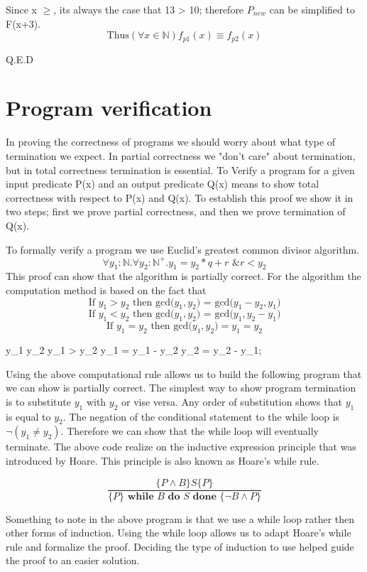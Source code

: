 \documentclass{article}
\begin{document}
Since x $\geq$, its always the case that 13 > 10; therefore $P_{new}$ can be simplified to F(x+3). 
\[\text{Thus} (\forall x \in \mathbb{N}) f_{p1} (x) \equiv f_{p2} (x)\]

Q.E.D

\section{Program verification }

In proving the correctness of programs we should worry about what type of termination we expect. In partial correctness we "don't care" about termination, but in total correctness termination is essential. To Verify a program for a given input predicate P(x) and an output predicate Q(x) means to show total correctness with respect to P(x) and Q(x). To establish this proof we show it in two steps; first we prove partial correctness, and then we prove termination of Q(x). 

To formally verify a program we use Euclid's greatest common divisor algorithm. 
\[\forall y_1 :\mathbb{N}. \forall y_2:\mathbb{N}^+ . y_1 = y_2 * q + r \text{ \& } r < y_2\]
This proof can show that the algorithm is partially correct. For the algorithm the computation method is based on the fact that 
\[\text{If  }y_1 >  y_2\text{ then  gcd(}y_1,y_2\text{) =  gcd(}y_1-y_2, y_1)\]
\[\text{If  }y_1 < y_2\text{ then  gcd(}y_1,y_2\text{) =  gcd(}y_1,y_2 - y_1)\]
\[\text{If  }y_1 =  y_2\text{ then  gcd(}y_1,y_2) = y_1 = y_2\]

\begin{program} 
\WHILE y_1 \neq y_2 \DO 
	\IF y_1 > y_2 \THEN y_1 = y_1 - y_2 \ELSE y_2 = y_2 - y_1; 
\end{program}

Using the above computational rule allows us to build the following program that we can show is partially correct. The simplest way to show program termination is to substitute $y_1$ with $y_2$ or vise versa. Any order of substitution shows that $y_1$ is equal to  $y_2$. The negation of the conditional statement to the while loop is $\neg(y_1 \neq y_2)$. Therefore we can show that the while loop will eventually terminate. The above code realize on the inductive expression principle that was introduced by Hoare. This principle is also known as Hoare's while rule. 

\[
 \frac{\{P \wedge B\} S\{P\}}{\{P\}\textbf{ while } B \textbf{ do } S \textbf{ done } \{\neg B \wedge P\}}
\]

Something to note in the above program is that we use a while loop rather then other forms of induction. Using the while loop allows us to adapt Hoare's while rule and formalize the proof. Deciding the type of induction to use helped guide the proof to an easier solution. 
\end{document}
